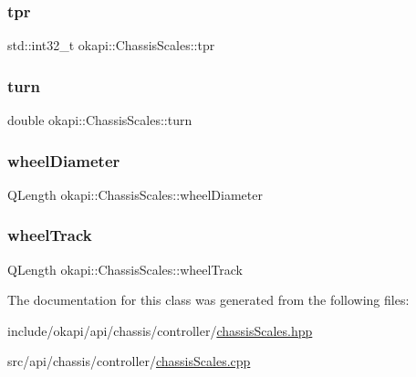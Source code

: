 \subsubsection{\texorpdfstring{tpr}{tpr}}
{\footnotesize\ttfamily std\+::int32\+\_\+t okapi\+::\+Chassis\+Scales\+::tpr}

\mbox{\label{classokapi_1_1ChassisScales_aa4babba4794c8f61d41ef6282ba94b64}} 
\subsubsection{\texorpdfstring{turn}{turn}}
{\footnotesize\ttfamily double okapi\+::\+Chassis\+Scales\+::turn}

\mbox{\label{classokapi_1_1ChassisScales_a08c7c4f04b6906683a056077cce18ba0}} 
\subsubsection{\texorpdfstring{wheelDiameter}{wheelDiameter}}
{\footnotesize\ttfamily Q\+Length okapi\+::\+Chassis\+Scales\+::wheel\+Diameter}

\mbox{\label{classokapi_1_1ChassisScales_af2e0c71b9daa9d4345de83967f9bf9c9}} 
\subsubsection{\texorpdfstring{wheelTrack}{wheelTrack}}
{\footnotesize\ttfamily Q\+Length okapi\+::\+Chassis\+Scales\+::wheel\+Track}



The documentation for this class was generated from the following files\+:\begin{DoxyCompactItemize}
\item 
include/okapi/api/chassis/controller/\mbox{\hyperlink{chassisScales_8hpp}{chassis\+Scales.\+hpp}}\item 
src/api/chassis/controller/\mbox{\hyperlink{chassisScales_8cpp}{chassis\+Scales.\+cpp}}\end{DoxyCompactItemize}
